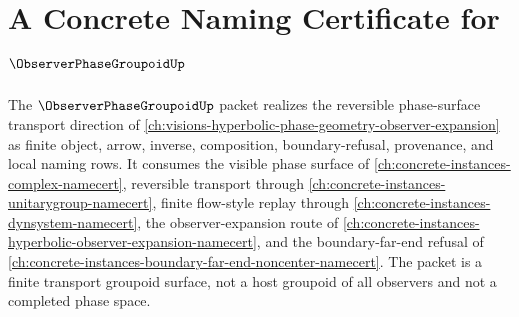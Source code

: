 \chapter{A Concrete Naming Certificate for $\ObserverPhaseGroupoidUp$}
\label{ch:concrete-instances-observer-phase-groupoid-namecert}

The $\ObserverPhaseGroupoidUp$ packet realizes the reversible phase-surface transport direction of \autoref{ch:visions-hyperbolic-phase-geometry-observer-expansion} as finite object, arrow, inverse, composition, boundary-refusal, provenance, and local naming rows. It consumes the visible phase surface of \autoref{ch:concrete-instances-complex-namecert}, reversible transport through \autoref{ch:concrete-instances-unitarygroup-namecert}, finite flow-style replay through \autoref{ch:concrete-instances-dynsystem-namecert}, the observer-expansion route of \autoref{ch:concrete-instances-hyperbolic-observer-expansion-namecert}, and the boundary-far-end refusal of \autoref{ch:concrete-instances-boundary-far-end-noncenter-namecert}. The packet is a finite transport groupoid surface, not a host groupoid of all observers and not a completed phase space.

